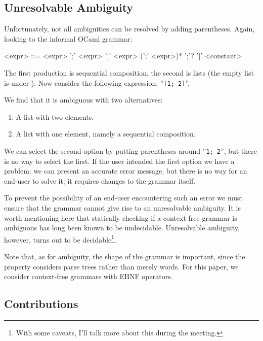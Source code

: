 \documentclass[sigplan]{acmart}\settopmatter{printfolios=true,printccs=false,printacmref=false}
\newcommand{\ocaml}{\lstinline[language={[objective]caml}]}
\begin{document}
\subsection{Unresolvable Ambiguity}

Unfortunately, not all ambiguities can be resolved by adding parentheses. Again, looking to the informal OCaml grammar:

\setlength{\grammarindent}{5em}
\begin{grammar}
<expr> ::= <expr> ';' <expr>
  \alt '[' <expr> (';' <expr>)* ';'? ']'
  \alt <constant>
\end{grammar}

\noindent The first production is sequential composition, the second is lists (the empty list is under ). Now consider the following expression: ''\ocaml{[1; 2]}''.

We find that it is ambiguous with two alternatives:
\begin{enumerate}
  \item A list with two elements.
  \item A list with one element, namely a sequential composition.
\end{enumerate}

We can select the second option by putting parentheses around ''\ocaml{1; 2}'', but there is no way to select the first. If the user intended the first option we have a problem: we can present an accurate error message, but there is no way for an end-user to solve it; it requires changes to the grammar itself.

To prevent the possibility of an end-user encountering such an error we must ensure that the grammar cannot give rise to an unresolvable ambiguity. It is worth mentioning here that statically checking if a context-free grammar is ambiguous has long been known to be undecidable. Unresolvable ambiguity, however, turns out to be decidable\footnote{With some caveats, I'll talk more about this during the meeting.}.

Note that, as for ambiguity, the shape of the grammar is important, since the property considers parse trees rather than merely words. For this paper, we consider context-free grammars with EBNF operators.

\subsection{Contributions}
\end{document}
